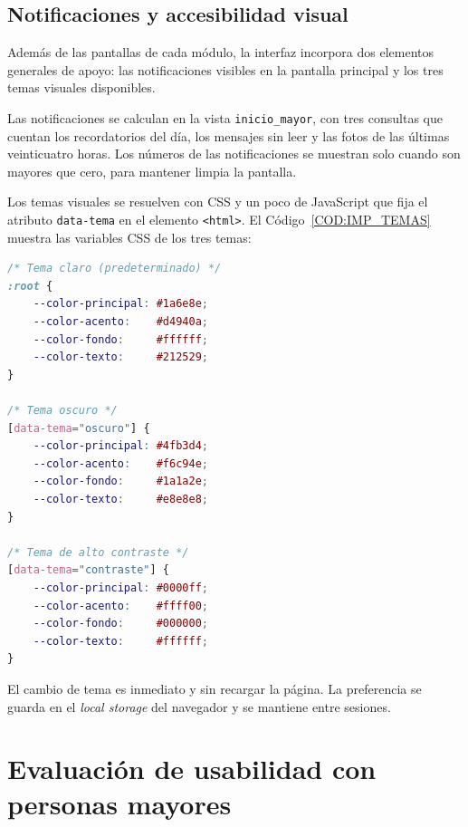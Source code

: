 \subsection{Notificaciones y accesibilidad
visual\label{SUB:IMP_NOTIFICACIONES}}

Además de las pantallas de cada módulo, la interfaz incorpora dos
elementos generales de apoyo: las notificaciones visibles en la pantalla
principal y los tres temas visuales disponibles.

Las notificaciones se calculan en la vista \texttt{inicio\_mayor}, con tres
consultas que cuentan los recordatorios del día, los mensajes sin leer y
las fotos de las últimas veinticuatro horas. Los números de las notificaciones se muestran solo
cuando son mayores que cero, para mantener limpia la pantalla.

Los temas visuales se resuelven con CSS y un poco de JavaScript que fija
el atributo \texttt{data-tema} en el elemento \texttt{<html>}. El
Código~\ref{COD:IMP_TEMAS} muestra las variables CSS de los tres temas:

\newpage
\begin{lstlisting}[language=CSS, caption={Variables CSS de los tres
temas visuales.}, label={COD:IMP_TEMAS}]
/* Tema claro (predeterminado) */
:root {
    --color-principal: #1a6e8e;
    --color-acento:    #d4940a;
    --color-fondo:     #ffffff;
    --color-texto:     #212529;
}

/* Tema oscuro */
[data-tema="oscuro"] {
    --color-principal: #4fb3d4;
    --color-acento:    #f6c94e;
    --color-fondo:     #1a1a2e;
    --color-texto:     #e8e8e8;
}

/* Tema de alto contraste */
[data-tema="contraste"] {
    --color-principal: #0000ff;
    --color-acento:    #ffff00;
    --color-fondo:     #000000;
    --color-texto:     #ffffff;
}
\end{lstlisting}

El cambio de tema es inmediato y sin recargar la página. La preferencia se guarda en
el \emph{local storage} del navegador y se mantiene entre sesiones.



\section{Evaluación de usabilidad con personas
mayores\label{SEC:IMP_AIPO}}

